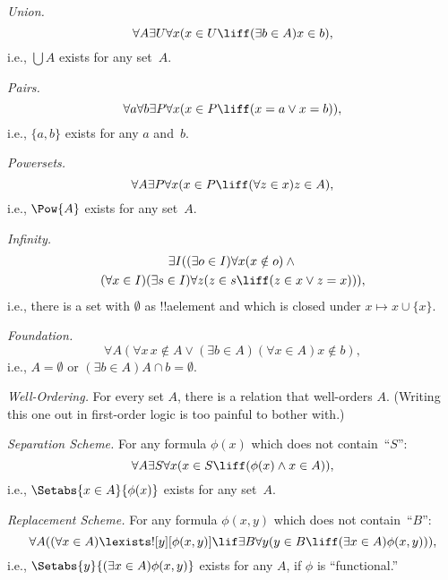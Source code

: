\begin{defish}
\emph{Union.} 
\[
\forall A \exists U \forall x(x \in U \liff (\exists b \in A)x \in b),
\]
i.e., $\bigcup A$ exists for any set~$A$.
\end{defish}

\begin{defish}
\emph{Pairs.} 
\[
\forall a \forall b \exists P \forall x (x \in P \liff
(x = a \lor x = b)),
\]
i.e., $\{a, b\}$ exists for any $a$ and~$b$.
\end{defish}

\begin{defish}
\emph{Powersets.}
\[
\forall A \exists P \forall x(x \in P \liff (\forall z \in x)z \in A),
\]
i.e., $\Pow{A}$ exists for any set~$A$.
\end{defish}

\begin{defish}
\emph{Infinity.}
\begin{multline*}
\exists I((\exists o \in I)\forall x(x \notin o) \land {}\\
(\forall x \in I)(\exists s \in I)\forall z(z \in s \liff (z \in x \lor z = x))),
\end{multline*}
i.e., there is a set with $\emptyset$ as !!a{element} and which 
is closed under $x \mapsto x \cup \{x\}$.
\end{defish}


\begin{defish}
\emph{Foundation.}
\[
\forall A(\forall x\, x \notin A \lor (\exists b \in A)(\forall x \in A)x \notin b),
\]
i.e., $A = \emptyset$ or $(\exists b \in A)A\cap b = \emptyset$.
\end{defish}

\begin{defish}
\emph{Well-Ordering.} 
For every set $A$, there is a relation that well-orders $A$.
(Writing this one out in first-order logic is too painful to bother with.)
\end{defish}

\begin{defish}
\emph{Separation Scheme.}
For any formula $\phi(x)$ which does not contain~``$S$'':
\[
\forall A \exists S \forall x(x \in S \liff (\phi(x) \land x \in A)),
\]
i.e., $\Setabs{x \in A}{\phi(x)}$ exists for any set~$A$.
\end{defish}

\begin{defish}
\emph{Replacement Scheme.} For any formula $\phi(x, y)$ which does not contain~``$B$'':
\[
\forall A((\forall x \in A)\lexists![y][\phi(x,y)] \lif \exists B \forall y (y \in B \liff (\exists x \in A)\phi(x,y))),
\]
i.e., $\Setabs{y}{(\exists x \in A)\phi(x,y)}$ exists for any $A$, if $\phi$ is ``functional.''
\end{defish}

